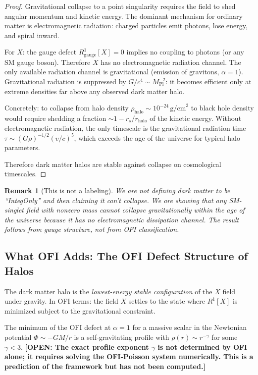 \documentclass[12pt]{article}
\newtheorem{remark}[theorem]{Remark}
\theoremstyle{definition}
\newcommand{\OPEN}[1]{\textcolor{opencolor}{\textbf{[OPEN: #1]}}}
\begin{document}
\begin{proof}
Gravitational collapse to a point singularity requires the field to shed
angular momentum and kinetic energy.  The dominant mechanism for ordinary
matter is electromagnetic radiation: charged particles emit photons, lose
energy, and spiral inward.

For $X$: the gauge defect $R^1_{\mathrm{gauge}}[X] = 0$ implies no
coupling to photons (or any SM gauge boson).  Therefore $X$ has no
electromagnetic radiation channel.  The only available radiation channel
is gravitational (emission of gravitons, $\alpha=1$).  Gravitational
radiation is suppressed by $G/c^4 \sim M_{\mathrm{Pl}}^{-2}$: it becomes
efficient only at extreme densities far above any observed dark matter halo.

Concretely: to collapse from halo density $\rho_{\mathrm{halo}} \sim
10^{-24}\,\mathrm{g/cm}^3$ to black hole density would require shedding
a fraction $\sim 1 - r_s/r_{\mathrm{halo}}$ of the kinetic energy.
Without electromagnetic radiation, the only timescale is the gravitational
radiation time $\tau \sim (G\rho)^{-1/2}(v/c)^5$, which exceeds the age
of the universe for typical halo parameters.

Therefore dark matter halos are stable against collapse on cosmological timescales.
\end{proof}

\begin{remark}[This is not a labeling]
We are not defining dark matter to be ``IntegOnly'' and then claiming it
can't collapse.  We are showing that \textit{any} SM-singlet field with
nonzero mass cannot collapse gravitationally within the age of the universe
because it has no electromagnetic dissipation channel.  The result follows
from gauge structure, not from OFI classification.
\end{remark}

\subsection{What OFI Adds: The OFI Defect Structure of Halos}

The dark matter halo is the \emph{lowest-energy stable configuration} of
the $X$ field under gravity.  In OFI terms: the field $X$ settles to the
state where $R^1[X]$ is minimized subject to the gravitational constraint.

The minimum of the OFI defect at $\alpha=1$ for a massive scalar in the
Newtonian potential $\Phi \sim -GM/r$ is a self-gravitating profile
with $\rho(r) \sim r^{-\gamma}$ for some $\gamma < 3$.  \OPEN{The exact
profile exponent $\gamma$ is not determined by OFI alone; it requires
solving the OFI-Poisson system numerically.  This is a prediction of the
framework but has not been computed.}
\end{document}
